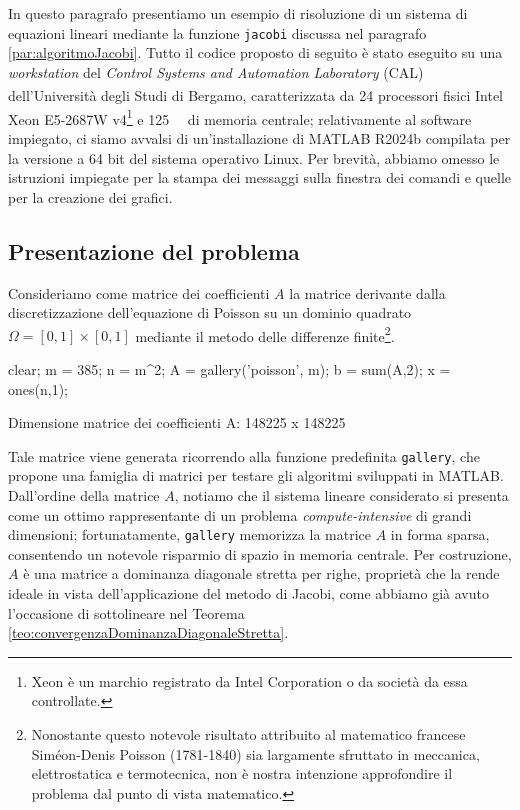 In questo paragrafo presentiamo un esempio di risoluzione di un sistema di equazioni lineari mediante la funzione
\lstinline{jacobi} discussa nel paragrafo \ref{par:algoritmoJacobi}. \newline
Tutto il codice proposto di seguito \`e stato eseguito su una \textit{workstation} del \textit{Control Systems and Automation Laboratory} (CAL) dell'Universit\`a degli Studi di Bergamo, caratterizzata da 24 processori fisici Intel\textsuperscript{\textregistered} Xeon\textsuperscript{\texttrademark} E5-2687W v4\footnote{Xeon \`e un marchio registrato da Intel Corporation o da societ\`a da essa controllate.} e \qty{125}{\giga\byte} di memoria centrale; relativamente al software impiegato, ci siamo avvalsi di un'installazione di MATLAB R2024b compilata per la versione a 64 bit del sistema operativo Linux.\newline
Per brevit\`a, abbiamo omesso le istruzioni impiegate per la stampa dei messaggi sulla finestra dei comandi e quelle per la creazione dei grafici.
\subsection{Presentazione del problema}
Consideriamo come matrice dei coefficienti $A$ la matrice derivante dalla discretizzazione dell'equazione di Poisson su un
dominio quadrato $\Omega=[0, 1]\times[0, 1]$ mediante il metodo delle differenze finite\footnote{
    Nonostante questo notevole risultato attribuito al matematico francese Sim\'eon-Denis Poisson (1781-1840) sia largamente sfruttato in meccanica,
    elettrostatica e termotecnica, non \`e nostra intenzione approfondire il problema dal punto di vista matematico.}.
\begin{matlabcode}
    clear;
    m = 385;
    n = m^2;
    A = gallery('poisson', m);
    b = sum(A,2);
    x = ones(n,1);
\end{matlabcode}
\begin{matlaboutput}
    Dimensione matrice dei coefficienti A: 148225 x 148225
\end{matlaboutput}
Tale matrice viene generata ricorrendo alla funzione predefinita \lstinline{gallery}, che propone una famiglia di matrici per testare gli algoritmi sviluppati in MATLAB.\newline
Dall'ordine della matrice $A$, notiamo che il sistema lineare considerato si presenta come un ottimo rappresentante
di un problema \textit{compute-intensive} di grandi dimensioni; fortunatamente, \lstinline{gallery} memorizza la matrice $A$ in
forma sparsa, consentendo un notevole risparmio di spazio in memoria centrale.\newline
Per costruzione, $A$ \`e una matrice a dominanza diagonale stretta per righe, propriet\`a che la rende ideale
in vista dell'applicazione del metodo di Jacobi, come abbiamo gi\`a avuto l'occasione di sottolineare nel Teorema
\ref{teo:convergenzaDominanzaDiagonaleStretta}.

